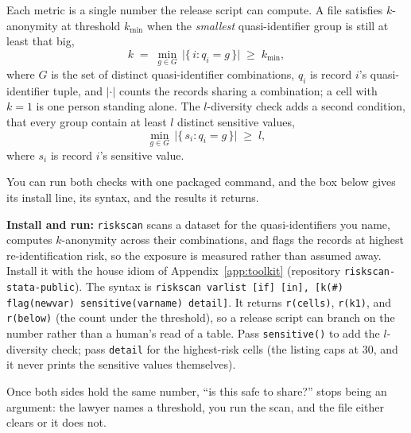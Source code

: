 Each metric is a single number the release script can compute. A file satisfies $k$-anonymity at threshold $k_{\min}$ when the \emph{smallest} quasi-identifier group is still at least that big,
\[
  k \;=\; \min_{g \in G}\, \bigl|\{\, i : q_i = g \,\}\bigr| \;\ge\; k_{\min},
\]
where $G$ is the set of distinct quasi-identifier combinations, $q_i$ is record $i$'s quasi-identifier tuple, and $\lvert\cdot\rvert$ counts the records sharing a combination; a cell with $k=1$ is one person standing alone. The $l$-diversity check adds a second condition, that every group contain at least $l$ distinct sensitive values,
\[
  \min_{g \in G}\, \bigl|\{\, s_i : q_i = g \,\}\bigr| \;\ge\; l,
\]
where $s_i$ is record $i$'s sensitive value.

You can run both checks with one packaged command, and the box below gives its install line, its syntax, and the results it returns.

\begin{kaobox}[frametitle=Package Integration: \texttt{riskscan}]
\textbf{Install and run:} \texttt{riskscan} scans a dataset for the quasi-identifiers you name, computes $k$-anonymity across their combinations, and flags the records at highest re-identification risk, so the exposure is measured rather than assumed away. Install it with the house idiom of Appendix~\ref{app:toolkit} (repository \texttt{riskscan-stata-public}).
The syntax is \texttt{riskscan varlist [if] [in], [k(\#) flag(newvar) sensitive(varname) detail]}. It returns \texttt{r(cells)}, \texttt{r(k1)}, and \texttt{r(below)} (the count under the threshold), so a release script can branch on the number rather than a human's read of a table. Pass \texttt{sensitive()} to add the $l$-diversity check; pass \texttt{detail} for the highest-risk cells (the listing caps at 30, and it never prints the sensitive values themselves).
\end{kaobox}

Once both sides hold the same number, \enquote{is this safe to share?} stops being an argument: the lawyer names a threshold, you run the scan, and the file either clears or it does not. 

